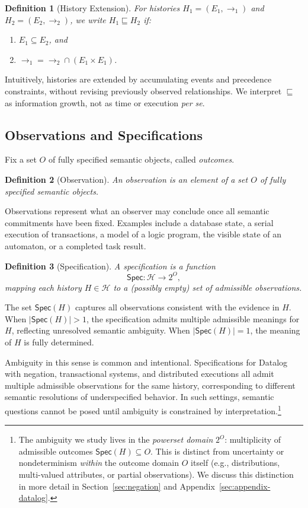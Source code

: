 \documentclass[acmsmall,nonacm]{acmart}
\newtheorem{definition}{Definition}
\theoremstyle{remark}
\numberwithin{definition}{section}
\numberwithin{theorem}{section}
\numberwithin{lemma}{section}
\numberwithin{corollary}{section}
\numberwithin{remark}{section}
\numberwithin{example}{section}
\numberwithin{observation}{section}
\numberwithin{assumption}{section}
\newcommand{\Hist}{\mathcal{H}}
\newcommand{\Spec}{\mathsf{Spec}}
\begin{document}
\begin{definition}[History Extension]
For histories $H_1=(E_1,\rightarrow_1)$ and $H_2=(E_2,\rightarrow_2)$, we write
$H_1 \sqsubseteq H_2$ if:
\begin{enumerate}
  \item $E_1 \subseteq E_2$, and
  \item $\rightarrow_1 = \rightarrow_2 \cap (E_1 \times E_1)$.
\end{enumerate}
\end{definition}

Intuitively, histories are extended by accumulating events and precedence constraints,
without revising previously observed relationships.
We interpret $\sqsubseteq$ as information growth, not as time or execution \emph{per se}.

\subsection{Observations and Specifications}
Fix a set $O$ of fully specified semantic objects, called \emph{outcomes}.
\begin{definition}[Observation]
An \emph{observation} is an element of a set $O$ of fully specified semantic objects.
\end{definition}

Observations represent what an observer may conclude once all semantic commitments have
been fixed.
Examples include a database state, a serial execution of transactions, a model of
a logic program, the visible state of an automaton, or a completed task result.

\begin{definition}[Specification]
A \emph{specification} is a function
\[
  \Spec : \Hist \to 2^{O},
\]
mapping each history $H \in \Hist$ to a (possibly empty) set of admissible observations.
\end{definition}

The set $\Spec(H)$ captures all observations consistent with the evidence in $H$.
When $|\Spec(H)| > 1$, the specification admits multiple admissible meanings for $H$,
reflecting unresolved semantic ambiguity.
When $|\Spec(H)| = 1$, the meaning of $H$ is fully determined.

Ambiguity in this sense is common and intentional.
Specifications for Datalog with negation, transactional systems, and distributed
executions all admit multiple admissible observations for the same history,
corresponding to different semantic resolutions of underspecified behavior.
In such settings, semantic questions cannot be posed until ambiguity is constrained
by interpretation.\footnote{%
The ambiguity we study lives in the \emph{powerset domain} $2^{O}$: multiplicity
of admissible outcomes $\Spec(H) \subseteq O$.
This is distinct from uncertainty or nondeterminism \emph{within} the outcome
domain $O$ itself (e.g., distributions, multi-valued attributes, or
partial observations).
We discuss this distinction in more detail in Section~\ref{sec:negation} and
Appendix~\ref{sec:appendix-datalog}.}
\end{document}
